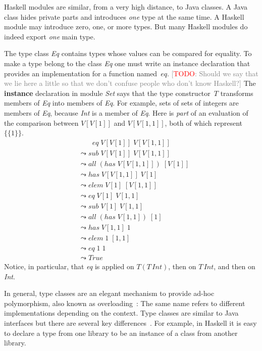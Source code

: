 \documentclass[conference,compsoc]{IEEEtran} %
\newcommand{\todo}[1]{{\small \textcolor{gray}{[\textcolor{red}{TODO}: #1]}}}
\begin{document}
Haskell modules are similar, from a very high distance, to Java classes.  A
Java class hides private parts and introduces \emph{one} type at the same
time. A Haskell module may introduce zero, one, or more types.  But many
Haskell modules do indeed export \emph{one} main type. 


The type class \textit{Eq} contains types whose values can be compared for
equality. To make a type belong to the class \textit{Eq} one must write an
instance declaration that provides an implementation for a function
named~$eq$. \todo{Should we say that we lie here a little so that we don't
confuse people who don't know Haskell?} The \textbf{instance} declaration
in module \textit{Set} says that the type constructor~$T$ transforms
members of \textit{Eq} into members of \textit{Eq}. For example, sets of
sets of integers are members of \textit{Eq}, because \textit{Int} is a
member of \textit{Eq}. Here is \emph{part} of an evaluation of the
comparison between $V[V[1]]$ and $V[V[1,1]]$, both of which
represent~$\{\{1\}\}$.
\begin{align*}
&\phantom{\;\leadsto\;}
  \mathit{eq}\;V[V[1]]\;V[V[1,1]] \\
&\leadsto
  \mathit{sub}\;V[V[1]]\;V[V[1,1]]\\
&\leadsto
  \mathit{all}\;(\mathit{has}\;V[V[1,1]])\;[V[1]]\\
&\leadsto
  \mathit{has}\;V[V[1,1]]\;V[1]\\
&\leadsto
  \mathit{elem}\;V[1]\;[V[1,1]]\\
&\leadsto
  \mathit{eq}\;V[1]\;V[1,1]\\
&\leadsto
  \mathit{sub}\;V[1]\;V[1,1]\\
&\leadsto
  \mathit{all}\;(\mathit{has}\;V[1,1])\;[1]\\
&\leadsto
  \mathit{has}\;V[1,1]\;1 \\
&\leadsto
  \mathit{elem}\;1\;[1,1]\\
&\leadsto
  \mathit{eq}\;1\;1\\
&\leadsto
  \mathit{True}
\end{align*}
Notice, in particular, that \textit{eq} is applied on $T(T\,\mathit{Int})$,
then on $T\,\mathit{Int}$, and then on \textit{Int}.

In general, type classes are an elegant mechanism to provide ad-hoc
polymorphism, also known as overloading~\cite{DBLP:conf/popl/WadlerB89}:
The same name refers to different implementations depending on the context.
Type classes are similar to Java interfaces but there are several key
differences~\cite{WEB:PJ-tc}. For example, in Haskell it is easy to declare
a type from one library to be an instance of a class from another library.
\end{document}
